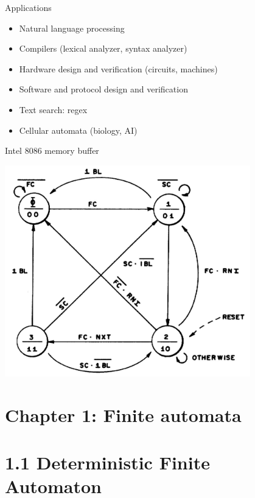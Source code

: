 \documentclass[handout]{beamer}
\begin{document}
\begin{frame}{Applications}

    \begin{itemize}
        \item Natural language processing
        \item Compilers (lexical analyzer, syntax analyzer) 
        \item Hardware design and verification (circuits, machines)
        \item Software and protocol design and verification
        \item Text search: regex
        \item Cellular automata (biology, AI)
    \end{itemize}

\end{frame}


\begin{frame}{Intel 8086 memory buffer}

    \begin{center}
        \includegraphics[width=0.8\textwidth]{files/8086.jpg}	
    \end{center}

\end{frame}


\section{\sc Chapter 1: Finite automata}


\section{1.1 Deterministic Finite Automaton}
\end{document}

